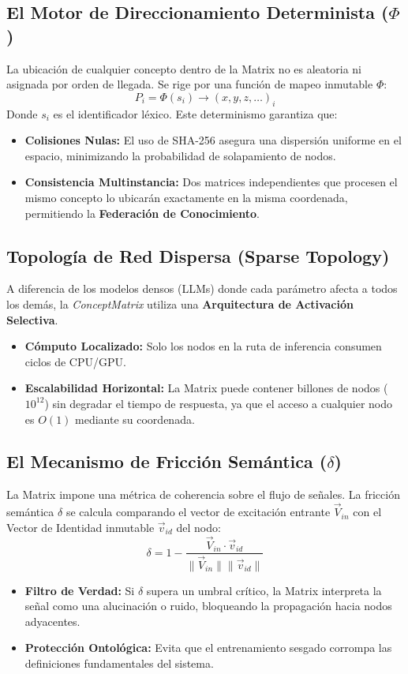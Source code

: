 \documentclass[12pt]{article}
\begin{document}
\subsection{El Motor de Direccionamiento Determinista ($\Phi$)}
La ubicación de cualquier concepto dentro de la Matrix no es aleatoria ni asignada por orden de llegada. Se rige por una función de mapeo inmutable $\Phi$:
\begin{equation}
	P_i = \Phi(s_i) \to (x, y, z, \dots)_i
\end{equation}
Donde $s_i$ es el identificador léxico. Este determinismo garantiza que:
\begin{itemize}
	\item \textbf{Colisiones Nulas:} El uso de SHA-256 asegura una dispersión uniforme en el espacio, minimizando la probabilidad de solapamiento de nodos.
	\item \textbf{Consistencia Multinstancia:} Dos matrices independientes que procesen el mismo concepto lo ubicarán exactamente en la misma coordenada, permitiendo la \textbf{Federación de Conocimiento}.
\end{itemize}

\subsection{Topología de Red Dispersa (Sparse Topology)}
A diferencia de los modelos densos (LLMs) donde cada parámetro afecta a todos los demás, la \textit{ConceptMatrix} utiliza una \textbf{Arquitectura de Activación Selectiva}.
\begin{itemize}
	\item \textbf{Cómputo Localizado:} Solo los nodos en la ruta de inferencia consumen ciclos de CPU/GPU.
	\item \textbf{Escalabilidad Horizontal:} La Matrix puede contener billones de nodos ($10^{12}$) sin degradar el tiempo de respuesta, ya que el acceso a cualquier nodo es $O(1)$ mediante su coordenada.
\end{itemize}



\subsection{El Mecanismo de Fricción Semántica ($\delta$)}
La Matrix impone una métrica de coherencia sobre el flujo de señales. La fricción semántica $\delta$ se calcula comparando el vector de excitación entrante $\vec{V}_{in}$ con el Vector de Identidad inmutable $\vec{v}_{id}$ del nodo:
\begin{equation}
	\delta = 1 - \frac{\vec{V}_{in} \cdot \vec{v}_{id}}{\|\vec{V}_{in}\| \|\vec{v}_{id}\|}
\end{equation}
\begin{itemize}
	\item \textbf{Filtro de Verdad:} Si $\delta$ supera un umbral crítico, la Matrix interpreta la señal como una alucinación o ruido, bloqueando la propagación hacia nodos adyacentes.
	\item \textbf{Protección Ontológica:} Evita que el entrenamiento sesgado corrompa las definiciones fundamentales del sistema.
\end{itemize}
\end{document}
